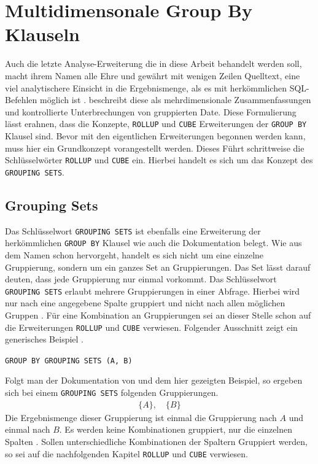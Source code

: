 \section{Multidimensonale Group By Klauseln}
\label{sec:rollup_and_cube} Auch die letzte Analyse-Erweiterung die in diese
Arbeit behandelt werden soll, macht ihrem Namen alle Ehre und gewährt mit wenigen
Zeilen Quelltext, eine viel analytischere Einsicht in die Ergebnismenge, als es mit
herkömmlichen SQL-Befehlen möglich ist \citep[vgl.][S. 303]{melton2002advanced}.
\citet[S. 303]{melton2002advanced} beschreibt diese als mehrdimensionale
Zusammenfassungen und kontrollierte Unterbrechungen von gruppierten Date. Diese Formulierung
lässt erahnen, dass die Konzepte, \texttt{ROLLUP} und \texttt{CUBE} Erweiterungen
der \texttt{GROUP BY} Klausel sind. Bevor mit den eigentlichen Erweiterungen begonnen
werden kann, muss hier ein Grundkonzept vorangestellt werden. Dieses Führt schrittweise
die Schlüsselwörter \texttt{ROLLUP} und \texttt{CUBE} ein. Hierbei handelt es
sich um das Konzept des \texttt{GROUPING SETS}.

\subsection{Grouping Sets}
\label{subsec:grouping_sets} Das Schlüsselwort \texttt{GROUPING SETS} ist
ebenfalls eine Erweiterung der herkömmlichen \texttt{GROUP BY} Klausel wie auch die
\citet{oracle16} Dokumentation belegt. Wie aus dem Namen schon hervorgeht,
handelt es sich nicht um eine einzelne Gruppierung, sondern um ein ganzes Set an
Gruppierungen. Das Set lässt darauf deuten, dass jede Gruppierung nur einmal vorkommt.
Das Schlüsselwort \texttt{GROUPING SETS} erlaubt mehrere Gruppierungen in einer Abfrage.
Hierbei wird nur nach eine angegebene Spalte gruppiert und nicht nach allen
möglichen Gruppen \cite{oracle16}. Für eine Kombination an Gruppierungen sei an dieser
Stelle schon auf die Erweiterungen \texttt{ROLLUP} und \texttt{CUBE} verwiesen.
Folgender Ausschnitt zeigt ein generisches Beispiel \citep[vgl.][]{oracle16}.
\begin{center}
	\texttt{GROUP BY GROUPING SETS (A, B)}
\end{center}
Folgt man der Dokumentation von \citet{oracle16} und dem hier gezeigten Beispiel,
so ergeben sich bei einem \texttt{GROUPING SETS} folgenden Gruppierungen.
\begin{align*}
	\{A\}, \quad \{B\}
\end{align*}
Die Ergebnismenge dieser Gruppierung ist einmal die Gruppierung nach $A$ und
einmal nach $B$. Es werden keine Kombinationen gruppiert, nur die einzelnen
Spalten \citep[vgl.][]{oracle16}. Sollen unterschiedliche Kombinationen der
Spaltern Gruppiert werden, so sei auf die nachfolgenden Kapitel \texttt{ROLLUP}
und \texttt{CUBE} verwiesen.

